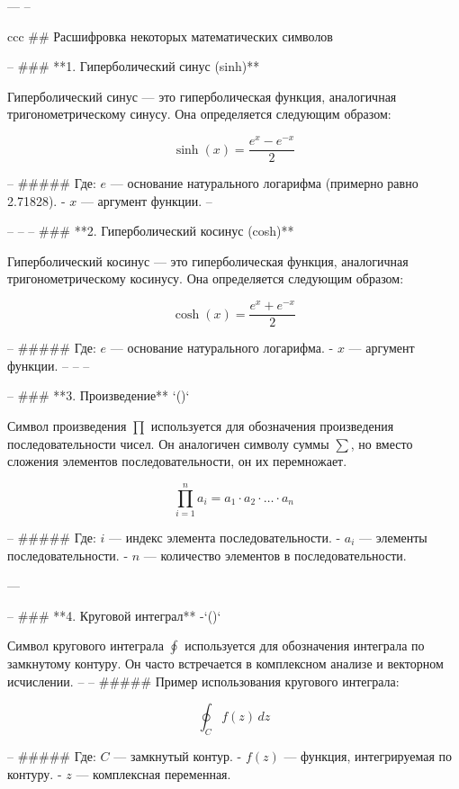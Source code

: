 ---
--  

  

ccc ## Расшифровка некоторых математических символов

-- ### **1. Гиперболический синус (sinh)**

Гиперболический синус — это гиперболическая функция, аналогичная тригонометрическому синусу. Она определяется следующим образом:

\[ \sinh(x) = \frac{e^x {-} e^{{-}x}}{2} \]

-- ##### Где:
 \( e \) — основание натурального логарифма (примерно равно 2.71828).
- \( x \) — аргумент функции.
-- 

-- 
-- 
--  ### **2. Гиперболический косинус (cosh)**

Гиперболический косинус — это гиперболическая функция, аналогичная тригонометрическому косинусу. Она определяется следующим образом:

\[ \cosh(x) = \frac{e^x + e^{{-}x}}{2} \]

-- #####  Где:
 \( e \) — основание натурального логарифма.
- \( x \) — аргумент функции.
-- 
-- 
--

--  ### **3. Произведение**  `(\prod)`

Символ произведения \(\prod\) используется для обозначения произведения последовательности чисел. Он аналогичен символу суммы \(\sum\), но вместо сложения элементов последовательности, он их перемножает.

 


\[ \prod_{i=1}^{n} a_i = a_1 \cdot a_2 \cdot \ldots \cdot a_n \]

-- #####  Где:
\( i \) — индекс элемента последовательности.
- \( a_i \) — элементы последовательности.
- \( n \) — количество элементов в последовательности.

---

--  ### **4. Круговой интеграл**
 -`(\oint)`

Символ кругового интеграла \(\oint\) используется для обозначения интеграла по замкнутому контуру. Он часто встречается в комплексном анализе и векторном исчислении.
--
-- ##### Пример использования  кругового интеграла:

\[ \oint_C f(z) \, dz \]

-- ##### Где:
\( C \) — замкнутый контур.
- \( f(z) \) — функция, интегрируемая по контуру.
- \( z \) — комплексная переменная.



